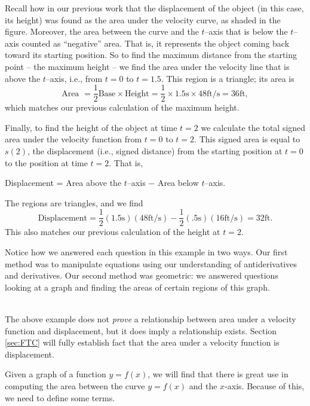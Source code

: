 {Recall how in our previous work that the displacement of the object (in this case, its height) was found as the area under the velocity curve, as shaded in the figure. Moreover, the area between the curve and the $t$--axis that is below the $t$--axis counted as ``negative'' area. That is, it represents the object coming back toward its starting position. So to find the maximum distance from the starting point -- the maximum height -- we find the area under the velocity line that is above the $t$--axis, i.e., from $t=0$ to $t=1.5$. This region is a triangle; its area is 
$$\text{Area } = \frac12\text{Base} \times \text{Height} =\frac12\times 1.5\text{s}\times 48\text{ft/s} = 36\text{ft},$$
which matches our previous calculation of the maximum height.

\drawexampleline
Finally, to find the height of the object at time $t=2$ we calculate the total signed area under the velocity function from $t=0$ to $t=2$. This signed area is equal to $s(2)$, the displacement (i.e., signed distance) from the starting position at $t=0$ to the position at time $t=2$. That is,
	\begin{center}
	Displacement = Area above the $t$--axis $-$ Area below $t$--axis.
	\end{center}
	The regions are triangles, and we find 
	$$\text{Displacement} = \frac12(1.5\text{s})(48\text{ft/s}) - \frac12(.5\text{s})(16\text{ft/s}) = 32\text{ft}.$$
This also matches our previous calculation of the height at $t=2$.

Notice how we answered each question in this example in two ways. Our first method was to manipulate equations using our understanding of antiderivatives and derivatives. Our second method was geometric: we answered questions looking at a graph and finding the areas of certain regions of this graph.
}\\

The above example does not \textit{prove} a relationship between area under a velocity function and displacement, but it does imply a relationship exists. Section \ref{sec:FTC} will fully establish fact that the area under a velocity function is displacement.

Given a graph of a function $y=f(x)$, we will find that there is great use in computing the area between the curve $y=f(x)$ and the $x$-axis. Because of this, we need to define some terms.

